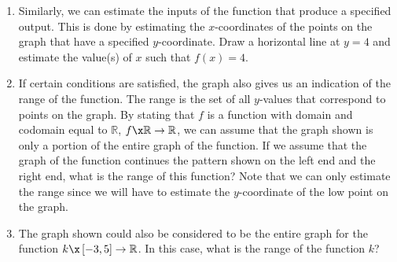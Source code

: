 \begin{activity}
\begin{enumerate}
\item Similarly, we can estimate the inputs of the function that produce a specified output.  This is done by estimating the $x$-coordinates of the points on the graph that have a specified 
$y$-coordinate.  Draw a horizontal line at  $y = 4$ and estimate the value(s) of  $x$  such that  $f( x ) = 4$.

\item If certain conditions are satisfied, the graph also gives us an indication of the range of the function.  The range is the set of all  $y$-values  that correspond to points on the graph.  By stating that  $f$  is a function with domain and codomain equal to  $\mathbb{R}$, $f\x \mathbb{R} \to \mathbb{R}$, we can assume that the graph shown is only a portion of the entire graph of the function.  If we assume that the graph of the function continues the pattern shown on the left end and the right end, what is the range of this function?  Note that we can only estimate the range since  we will have to estimate the $y$-coordinate of the low point on the graph.

\item The graph shown could also be considered to be the entire graph for the function  
$k\x \left[ { - 3, 5} \right] \to \mathbb{R}$.  In this case, what is the range of the function  $k$?
\end{enumerate}

\end{activity}
\hbreak

\endinput











\begin{center}
\setlength{\unitlength}{0.3cm}
\begin{picture}(14,14)
\put(2,6){\oval(4,12)}
\put(10,6){\oval(4,8)}

\put(2,2){\circle*{.5}}
\put(2,6){\circle*{.5}}
\put(2,10){\circle*{.5}}

\put(10,4){\circle*{.5}}
\put(10,8){\circle*{.5}}

\put(1,1.8){3}
\put(1,5.8){2}
\put(1,9.8){1}
\put(10.5,3.8){$b$}
\put(10.5,7.8){$a$}

\put(1.8,12.5){$A$}
\put(10,12.5){$B$}

\put(3,12.8){\vector(1,0){7}}
\put(6,13.2){$F$}

\put(2.5,2){\vector(4,1){7.1}}
\put(2.5,6){\vector(4,1){7.1}}
\put(2.5,10){\vector(4,-1){7.1}}

\end{picture}
\end{center}

\endinput

